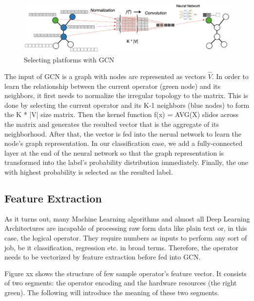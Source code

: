 \begin{figure}
  \centering
  \includegraphics[width=\linewidth]{figures/gcn.png}
  \caption{Selecting platforms with GCN}
  \label{fig:gcn}
\end{figure}

The input of GCN is a graph with nodes are represented as vectors $\hat{V}$. 
In order to learn the relationship between the current operator (green node) and its neighbors, it first needs to normalize the irregular topology to the matrix. 
This is done by selecting the current operator and its K-1 neighbors (blue nodes) to form the K * |V| size matrix. 
Then the kernel function f(x) = AVG(X) slides across the matrix and generates the resulted vector that is the aggregate of its neighborhood. 
After that, the vector is fed into the nerual network to learn the node's graph representation. 
In our classification case, we add a fully-connected layer at the end of the neural network so that the graph representation is transformed into the label's probability distribution immediately. 
Finally, the one with highest probability is selected as the resulted label.

\subsection{Feature Extraction}

As it turns out, many Machine Learning algorithms and almost all Deep Learning Architectures are incapable of processing raw form data like plain text or, in this case, the logical operator. 
They require numbers as inputs to perform any sort of job, be it classification, regression etc. in broad terms. 
Therefore, the operator needs to be vectorized by feature extraction before fed into GCN.

Figure xx shows the structure of few sample operator's feature vector. 
It consists of two segments: the operator encoding and the hardware resources (the right green). 
The following will introduce the meaning of these two segments.

